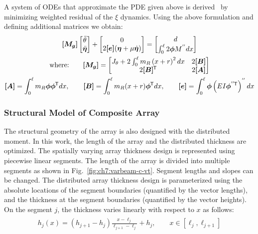 A system of ODEs that approximate the PDE given above is derived~\cite{Nakka2016a} by minimizing weighted residual of the $\xi$ dynamics. Using the above formulation and defining additional matrices we obtain:
\begin{gather}
\begin{aligned}
\bm{[M_{g}]} \begin{bmatrix} \ddot{\theta} \\ \ddot{\bm{\eta}} \end{bmatrix} +  \begin{bmatrix} 0 \\  2\bm{[e]}(\bm{\eta} +\mu \dot{\bm{\eta}}) \end{bmatrix} = \begin{bmatrix} d \\ \int_{0}^{\ell} 2 \bm{\phi} M^{''} dx \end{bmatrix}
\end{aligned}\label{eq:ch7:EL_system} \\
\begin{gathered}
\text{where:} \qquad \bm{[M_{g}]} = \begin{bmatrix} J_{\theta} + 2\int_{0}^{\ell} m_{R}\left(x+r\right)^2 dx  & 2 \bm{[B]} \\ 2 \bm{[B]}^{\mkern-1.5mu\mathsf{T}} & 2\bm{[A]} \end{bmatrix} \\
 \bm{[A]} = \int_{0}^{\ell} m_{R}\bm{\phi} \bm{\phi}^{\mkern-1.5mu\mathsf{T}} dx, \qquad  \bm{[B]}= \int_{0}^{\ell} m_{R}(x+r) \bm{\phi}^{\mkern-1.5mu\mathsf{T}} dx,
\qquad \bm{[e]} =\int_{0}^{\ell} \bm{\phi} \left(EI\bm{\phi}^{''{\mkern-1.5mu\mathsf{T}}} \right)^{''} dx
\end{gathered} \notag
\end{gather}

\subsubsection{Structural Model of Composite Array \label{sec:ch7:structural}}

The structural geometry of the array is also designed with the distributed moment. In this work, the length of the array and the distributed thickness are optimized. The spatially varying array thickness design is represented using piecewise linear segments. The length of the array is divided into multiple segments as shown in Fig.~\ref{fig:ch7:varbeam-c-vt}. Segment lengths and slopes can be changed. The distributed array thickness design is parameterized using the absolute locations of the segment boundaries (quantified by the vector \gls{lengths}), and the thickness at the segment boundaries (quantified by the vector \gls{heights}). On the segment $j$, the thickness varies linearly with respect to $x$ as follows:
\begin{align}
\begin{aligned}
h_j(x)=(h_{j+1}-h_{j})\frac{x-\ell_{j}}{\ell_{j+1}-\ell_{j}}+h_{j}, \qquad x \in [\ell_j,\ell_{j+1}]
\end{aligned} \label{eq:ch7:thickness}
\end{align}

